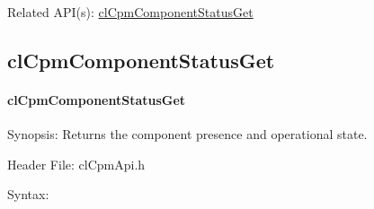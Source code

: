 {\begin{Desc}
\item[Related API(s):]\hyperlink{group__group14}{cl\-Cpm\-Component\-Status\-Get} \end{Desc}
\newpage



\subsection{clCpmComponentStatusGet}
\hypertarget{pagecpm132}{}\paragraph{cl\-Cpm\-Component\-Status\-Get}\label{pagecpm132}
\begin{Desc}
\item[Synopsis:]Returns the component presence and operational state.\end{Desc}
\begin{Desc}
\item[Header File:]clCpmApi.h\end{Desc}
\begin{Desc}
\item[Syntax:]


\end{Desc}}
